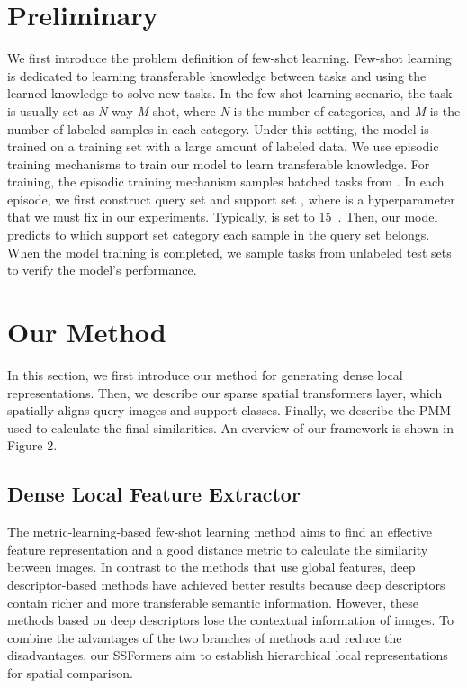 \documentclass{SCIS2019}
\begin{document}
\section{Preliminary}
We first introduce the problem definition of few-shot learning.
Few-shot learning is dedicated to learning transferable knowledge between tasks and using the learned knowledge to solve new tasks. In the few-shot learning scenario, the task is usually set as \emph{N}-way \emph{M}-shot, where \emph{N} is the number of categories, and \emph{M} is the number of labeled samples in each category. Under this setting, the model is trained on a training set  with a large amount of labeled data. We use episodic training mechanisms to train our model to learn transferable knowledge. For training, the episodic training mechanism samples batched tasks from . In each episode, we first construct query set  and support set , where  is a hyperparameter that we must fix in our experiments. Typically,  is set to 15~\cite{14,19}. Then, our model predicts to which support set category each sample in the query set belongs. When the model training is completed, we sample tasks from unlabeled test sets  to verify the model's performance.


\section{Our Method}
In this section, we first introduce our method for generating dense local representations. Then, we describe our sparse spatial transformers layer, which spatially aligns query images and support classes. Finally, we describe the PMM used to calculate the final similarities. An overview of our framework is shown in Figure 2.

\subsection{Dense Local Feature Extractor}
The metric-learning-based few-shot learning method aims to find an effective feature representation and a good distance metric to calculate the similarity between images. In contrast to the methods that use global features, deep descriptor-based methods have achieved better results because deep descriptors contain richer and more transferable semantic information. However, these methods based on deep descriptors lose the contextual information of images. To combine the advantages of the two branches of methods and reduce the disadvantages, our SSFormers aim to establish hierarchical local representations for spatial comparison. 
\end{document}
